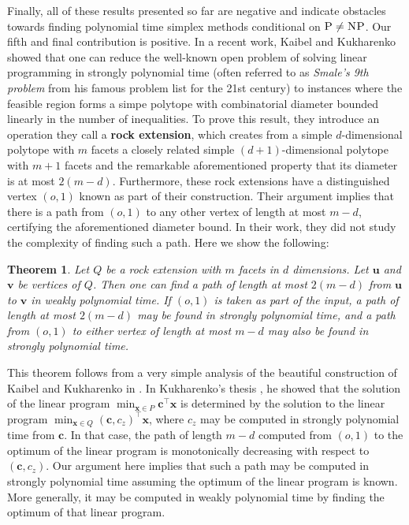 \documentclass[centering,11pt,reqno]{amsart}
\newtheorem{theorem}{Theorem}[section]
\theoremstyle{definition}
\newcommand{\NP}{\textsc{NP}}
\newcommand{\PP}{\textsc{P}}
\begin{document}
Finally, all of these results presented so far are negative and indicate obstacles towards finding polynomial time simplex methods  conditional on $\PP \neq \NP$. Our fifth and final contribution is positive. In a recent work, Kaibel and Kukharenko~\cite{RockExtensions} showed that one can reduce the well-known open problem of solving linear programming in strongly polynomial time (often referred to as \emph{Smale's 9th problem} from his famous problem list for the 21st century) to instances where the feasible region forms a simpe polytope with combinatorial diameter bounded linearly in the number of inequalities. To prove this result, they introduce an operation they call a \textbf{rock extension}, which creates from a simple $d$-dimensional polytope with $m$ facets a closely related simple $(d+1)$-dimensional polytope with $m+1$ facets and the remarkable aforementioned property that its diameter is at most $2(m-d)$. Furthermore, these rock extensions have a distinguished vertex $(o,1)$ known as part of their construction. Their argument implies that there is a path from $(o,1)$ to any other vertex of length at most $m-d$, certifying the aforementioned diameter bound. In their work, they did not study the complexity of finding such a path. Here we show the following:
\begin{theorem} \label{thm:rockextension}
Let $Q$ be a rock extension with $m$ facets in $d$ dimensions. Let $\mathbf{u}$ and $\mathbf{v}$ be vertices of $Q$. Then one can find a path of length at most $2(m-d)$ from $\mathbf{u}$ to $\mathbf{v}$ in weakly polynomial time. If $(o,1)$ is taken as part of the input, a path of length at most $2(m-d)$ may be found in strongly polynomial time, and a path from $(o,1)$ to either vertex of length at most $m-d$ may also be found in strongly polynomial time.
\end{theorem}

This theorem follows from a very  simple analysis of the beautiful construction of Kaibel and Kukharenko in \cite{RockExtensions}. In Kukharenko's thesis \cite{kirllthesis}, he showed that the solution of the linear program $\min_{\mathbf{x}\in P}\mathbf{c}^{\intercal} \mathbf{x}$ is determined by the solution to the linear program $\min_{\mathbf{x}\in Q}(\mathbf{c},c_{z})^{\intercal}\mathbf{x}$, where $c_{z}$ may be computed in strongly polynomial time from $\mathbf{c}$. In that case, the path of length $m-d$ computed from $(o,1)$ to the optimum of the linear program is monotonically decreasing with respect to $(\mathbf{c}, c_{z})$. Our argument here implies that such a path may be computed in strongly polynomial time assuming the optimum of the linear program is known. More generally, it may be computed in weakly polynomial time by finding the optimum of that linear program.
\end{document}
